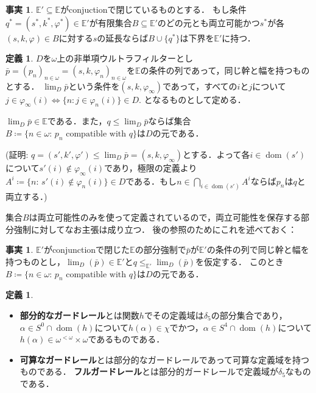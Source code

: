 \documentclass[uplatex,dvipdfmx]{jsarticle}
\newcommand{\dom}{\operatorname{dom}}
\newcommand{\Eor}{\mathbb{E}}
\theoremstyle{definition}
\newtheorem{defi}[thm]{定義}
\newtheorem{fact}[thm]{事実}
\begin{document}
	
	\begin{fact}\label{fact:bla}
		$\Eor'\subseteq \Eor$がconjuctionで閉じているものとする．
		もし条件$q^* =(s^*,k^*,\varphi^ *) \in \Eor'$が有限集合$B\subseteq \Eor'$のどの元とも両立可能かつ$s^*$が各$(s,k,\varphi)\in B$に対する$s$の延長ならば$B\cup \{q^*\}$は下界を$\Eor'$に持つ． 
	\end{fact}


	\begin{defi}
		$D$を$\omega$上の非単項ウルトラフィルターとし$\bar p = 
		(p_n)_{n\in \omega} = (s,k,\varphi_n)_{n\in \omega}$を$\Eor$の条件の列であって，同じ幹と幅を持つものとする． 
		$\lim_D\bar p$という条件を$(s,k,\varphi_\infty)$であって，すべての$i$と$j$について
		$
		j\in \varphi_\infty(i) \Leftrightarrow \{ n: j\in \varphi_n(i)\}\in D
		$.
		となるものとして定める．
	\end{defi}

	$\lim_D\bar p\in\Eor$である．また，$q\le \lim_D \bar p$ならば集合$B\coloneq\{ n\in \omega:\, p_n \text{ compatible with } q\}$は$D$の元である．
	
	(証明: $q=(s',k',\varphi')\le \lim_D\bar p=(s,k,\varphi_\infty)$とする．よって各$i\in\dom(s')$について$s'(i)\notin \varphi_\infty(i)$であり，極限の定義より$A^i \coloneq\{n:\, s'(i)\notin \varphi_n(i)\}\in D$である．もし$n\in\bigcap_{i\in\dom(s')} A^i$ならば$p_n$は$q$と両立する．)
	
	
	集合$B$は両立可能性のみを使って定義されているので，両立可能性を保存する部分強制に対してなお主張は成り立つ．
	後の参照のためにこれを述べておく：
	\begin{fact}\label{fact:blubb4}
		$\Eor'$がconjunctionで閉じた$\Eor$の部分強制で$\bar p$が$\Eor'$の条件の列で同じ幹と幅を持つものとし，$\lim_D(\bar p)\in \Eor'$と$q\le_{\Eor'} \lim_D(\bar p)$を仮定する．
		このとき
		$B\coloneq\{ n\in \omega:\, p_n \text{ compatible with } q\}$は$D$の元である．
	\end{fact}
		
		\begin{defi}
			\begin{itemize}
				\item \textbf{部分的なガードレール}とは関数$h$でその定義域は$\delta_5$の部分集合であり，$\alpha\in S^0\cap\dom(h)$について$h(\alpha)\in \chi$でかつ，$\alpha\in S^4\cap\dom(h)$について$h(\alpha)
				\in \omega^{<\omega}\times \omega$であるものである．
				\item \textbf{可算なガードレール}とは部分的なガードレールであって可算な定義域を持つものである．
				\textbf{フルガードレール}とは部分的ガードレールで定義域が$\delta_5$なものである．
			\end{itemize}
		\end{defi}
	
\end{document}
